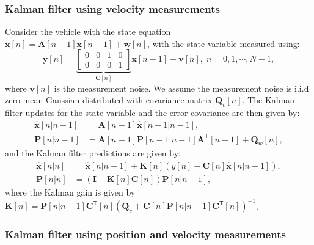 \documentclass[11pt]{article}
\newcommand{\by}{\mathbf{y}}
\newcommand{\bv}{\mathbf{v}}
\newcommand{\bx}{\mathbf{x}}
\newcommand{\bw}{\mathbf{w}}
\newcommand{\bI}{\mathbf{I}}
\newcommand{\bA}{\mathbf{A}}
\newcommand{\bK}{\mathbf{K}}
\newcommand{\bQ}{\mathbf{Q}}
\newcommand{\bP}{\mathbf{P}}
\newcommand{\bC}{\mathbf{C}}
\newcommand{\TT}{\mathsf{T}}
\begin{document}

\subsubsection{Kalman filter using velocity measurements}
\label{subsubsec:velocityKalmanFilter}

Consider the vehicle with the state equation $\bx[n] = \bA[n-1]\bx[n-1] + \bw[n]$, with the state variable measured using:
\begin{equation}
	\by[n] = \underbrace{\begin{bmatrix}
		0 & 0 & 1 & 0 \\
		0 & 0 & 0 & 1
	\end{bmatrix}}_{\bC[n]} \bx[n-1] + \bv[n], \; n=0,1,\cdots,N-1,
\label{eq:velMeasurements}
\end{equation}
where $\bv[n]$ is the measurement noise. We assume the measurement noise is i.i.d zero mean Gaussian distributed with covariance matrix $\bQ_{v}[n]$. The Kalman filter updates for the state variable and the error covariance are then given by:
\begin{equation}
\begin{split}
	\hat{\bx}[n|n-1] &= \bA[n-1] \hat{\bx}[n-1|n-1], \\
	\bP[n|n-1] &= \bA[n-1] \bP[n-1|n-1] \bA^{\TT}[n-1] + \bQ_{w}[n],
\end{split}
\label{eq:kalmanUpdate}
\end{equation}
and the Kalman filter predictions are given by:
\begin{equation}
\begin{split}
	\hat{\bx}[n|n] &= \hat{\bx}[n|n-1] + \bK[n] \left( y[n] - \bC[n]\hat{\bx}[n|n-1] \right), \\
	\bP[n|n] &= \left(\bI - \bK[n]\bC[n]\right)\bP[n|n-1],
\end{split}
\label{eq:kalmanPredict}
\end{equation}
where the Kalman gain is given by $\bK[n] = \bP[n|n-1]\bC^{\TT}[n]\left(\bQ_{v}+\bC[n]\bP[n|n-1]\bC^{\TT}[n]\right)^{-1}$.


\subsubsection{Kalman filter using position and velocity measurements}
\label{subsubsec:fullKalmanFilter}
\end{document}
